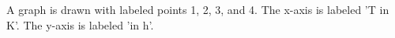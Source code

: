 A graph is drawn with labeled points 1, 2, 3, and 4. The x-axis is labeled 'T in K'. The y-axis is labeled 'in h'.